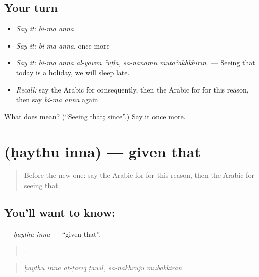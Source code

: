 \subsection*{Your turn}
\begin{itemize}
\raggedright
  \item \emph{Say it:} \emph{bi-mā anna}
  \item \emph{Say it:} \emph{bi-mā anna}, once more
  \item \emph{Say it:} \emph{bi-mā anna al-yawm ʿuṭla, sa-nanāmu mutaʾakhkhirīn.} — Seeing that today is a holiday, we will sleep late.
  \item \emph{Recall:} say the Arabic for consequently, then the Arabic for for this reason, then say \emph{bi-mā anna} again
\end{itemize}

\begin{tcolorbox}[breakable,colback=teal!4,colframe=teal!35!black,title={Before you move on}]
What does   mean? (\textquotedblleft{}Seeing that; since\textquotedblright{}.) Say it once more.
\end{tcolorbox}
\section[\texorpdfstring{\ar{حيث} \ar{إن} (ḥaythu inna)}{حيث إن (ḥaythu inna)}]{  (ḥaythu inna) — given that}

\label{lesson:AR-C374-haythu-inna}



\begin{quote}
Before the new one: say the Arabic for for this reason, then the Arabic for seeing that.
\end{quote}

\subsection*{You'll want to know:  }
\textbf{ } — \emph{ḥaythu inna} — \textquotedblleft{}given that\textquotedblright{}.

\begin{quote}
     .
\end{quote}

\begin{quote}
\emph{ḥaythu inna aṭ-ṭarīq ṭawīl, sa-nakhruju mubakkiran.}
\end{quote}

